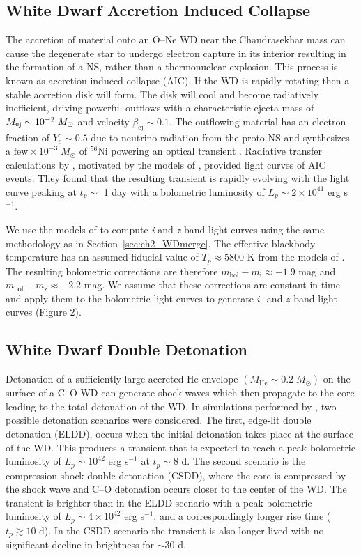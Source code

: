 \subsection{White Dwarf Accretion Induced Collapse}
\label{sec:AIC}
The accretion of material onto an O--Ne WD near the Chandrasekhar mass can cause the degenerate star to undergo electron capture in its interior resulting in the formation of a NS, rather than a thermonuclear explosion. This process is known as accretion induced collapse (AIC). If the WD is rapidly rotating then a stable accretion disk will form. The disk will cool and become radiatively inefficient, driving powerful outflows with a characteristic ejecta mass of $M_{\rm ej} \sim 10^{-2}\;M_{\odot}$ and velocity $\beta_{\text{ej}} \sim 0.1$. The outflowing material has an electron fraction of $Y_e \sim 0.5$ due to neutrino radiation from the proto-NS and synthesizes $\text{a few} \times 10^{-3}\; M_{\odot}$ of ${}^{56}$Ni powering an optical transient \citep{Metzger+09b}. Radiative transfer calculations by \citet{Darbha+10}, motivated by the models of \citet{Metzger+09b}, provided light curves of AIC events. They found that the resulting transient is rapidly evolving with the light curve peaking at $t_p \sim$ 1 day with a bolometric luminosity of $L_p \sim 2\times10^{41}$ erg s$^{-1}$.

We use the models of \citet{Darbha+10} to compute \emph{i} and \emph{z}-band light curves using the same methodology as in Section~\ref{sec:ch2_WDmerge}. The effective blackbody temperature has an assumed fiducial value of $T_p \approx 5800$ K from the models of \citet[see their Figure 3]{Darbha+10}. The resulting bolometric corrections are therefore $m_{\text{bol}} - m_{\text{i}} \approx -1.9$ mag and $m_{\text{bol}} - m_{\text{z}} \approx -2.2$ mag. We assume that these corrections are constant in time and apply them to the bolometric light curves to generate $i$- and $z$-band light curves (Figure 2).

\subsection{White Dwarf Double Detonation}
\label{sec:ch2_ELDD}
Detonation of a sufficiently large accreted He envelope $(M_{\text{He}} \sim 0.2\; M_{\odot})$ on the surface of a C--O WD can generate shock waves which then propagate to the core leading to the total detonation of the WD. In simulations performed by \citet{Sim+12}, two possible detonation scenarios were considered. The first, edge-lit double detonation (ELDD), occurs when the initial detonation takes place at the surface of the WD. This produces a transient that is expected to reach a peak bolometric luminosity of $L_p \sim 10^{42}$ erg s$^{-1}$ at $t_p \sim 8$ d. The second scenario is the compression-shock double detonation (CSDD), where the core is compressed by the shock wave and C--O detonation occurs closer to the center of the WD. The transient is brighter than in the ELDD scenario with a peak bolometric luminosity of $L _p \sim 4\times10^{42}$ erg s$^{-1}$, and a correspondingly longer rise time ($t_p  \gtrsim 10$ d). In the CSDD scenario the transient is also longer-lived with no significant decline in brightness for $\sim 30$ d.

